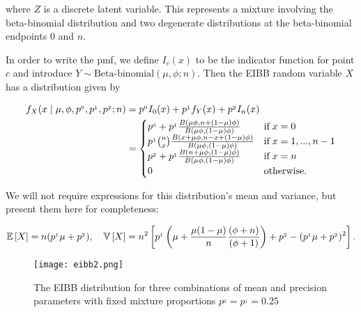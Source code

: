 where $Z$ is a discrete latent variable. This represents a mixture involving the beta-binomial distribution and two degenerate distributions at the beta-binomial endpoints $0$ and $n$.

In order to write the pmf, we define $I_c(x)$ to be the indicator function for point $c$ and introduce $Y \sim \text{Beta-binomial}(\mu, \phi; n)$. Then the EIBB random variable $X$ has a distribution given by

\begin{equation}
\begin{split}
f_{X}(x \mid \mu, \phi, p^{_0}, p^{_1}, p^{_2}; n)
&= p^{_0}I_0(x) + p^{_1} f_{Y}(x) + p^{_2}I_n(x)\\
&=	\begin{cases}
p^{_0} + p^{_1} {B(\mu\phi, n+(1-\mu)\phi) \over B(\mu\phi,(1-\mu)\phi)} & \text{if}\; x=0\\
p^{_1} {n \choose x} {B(x+\mu\phi, n-x+(1-\mu)\phi) \over B(\mu\phi,(1-\mu)\phi)} & \text{if}\; x=1,...,n-1\\
p^{_2} + p^{_1} {B(n+\mu\phi, (1-\mu)\phi) \over B(\mu\phi,(1-\mu)\phi)} & \text{if}\; x=n\\
0 & \text{otherwise.}
	\end{cases}
\end{split}
\label{densidad}
\end{equation}

We will not require expressions for this distribution's mean and variance, but present them here for completeness:

\begin{equation}
\begin{split}
{\mathbb E}\left[ X \right] = n(p^{_1}\mu + p^{_2}), \quad {\mathbb V}\left[ X \right] = n^2\left[ p^{_1}\left( \mu + \frac{ \mu(1-\mu)}{n}\frac{(\phi + n)}{(\phi+1)} \right) + p^{_2} - (p^{_1}\mu + p^{_2})^2\right].
\end{split}
\end{equation}

\begin{figure}
  \texttt{[image: eibb2.png]}
  \caption{The EIBB distribution for three combinations of mean and precision parameters with fixed mixture proportions $p^{_0} = p^{_1} = 0.25$}
  \label{fig:eibb}
\end{figure}